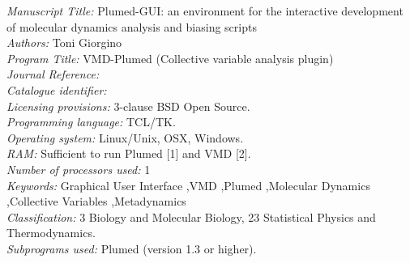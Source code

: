 \documentclass[preprint,review,11pt]{elsarticle}
\newcounter{bla}
\newcommand{\mytitle}{Plumed-GUI: an environment for the interactive development 
  of molecular dynamics analysis and biasing scripts}
\newcommand{\mykeywords}{Graphical User Interface \sep VMD \sep Plumed \sep Molecular Dynamics \sep Collective Variables \sep Metadynamics}
\begin{document}
\begin{small}
\noindent
{\em Manuscript Title:}                                       
 \mytitle \\
{\em Authors:}                                                
 Toni Giorgino \\
{\em Program Title:}                                          
 VMD-Plumed (Collective variable analysis plugin) \\
{\em Journal Reference:}                                      \\
{\em Catalogue identifier:}                                   \\
{\em Licensing provisions:}                                   
 3-clause BSD Open Source. \\
{\em Programming language:}                                   
 TCL/TK. \\
{\em Operating system:}                                       
 Linux/Unix, OSX, Windows. \\
{\em RAM:}                                               
 Sufficient to run Plumed [1] and VMD [2]. \\
{\em Number of processors used:}                              
 1 \\
{\em Keywords:} \mykeywords \\
{\em Classification:}                                         
  3 Biology and Molecular Biology, 23 Statistical Physics and Thermodynamics. \\
{\em Subprograms used:}                                       
  Plumed (version 1.3 or higher). \\

\end{small}
\end{document}
